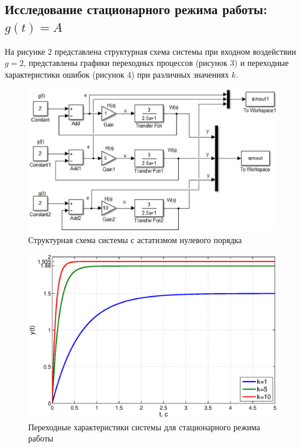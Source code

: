 \documentclass[12pt,a4paper]{article}
\begin{document}
\subsection{Исследование стационарного режима работы: $g(t)=A$} 
На рисунке 2 представлена структурная схема системы при входном воздействии \\$g=2$, представлены графики переходных процессов (рисунок 3) и переходные характеристики ошибок (рисунок 4) при различных значениях $k$. 
\begin{figure}[h!]
	\centering
	\includegraphics[width=0.8\linewidth]{cxema1.eps}
	\caption{Структурная схема системы с астатизмом нулевого порядка}
\end{figure}
\begin{figure}[H]
	\centering
	\includegraphics[width=1\linewidth]{1.1.1.eps}
	\caption{Переходные характеристики системы для стационарного режима работы}
\end{figure}
\end{document}
